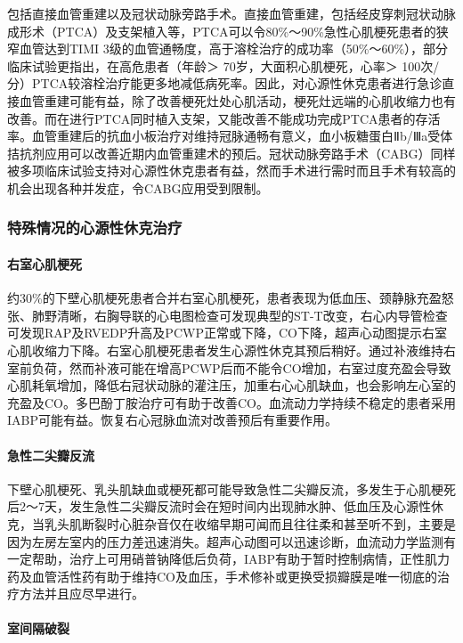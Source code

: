 包括直接血管重建以及冠状动脉旁路手术。直接血管重建，包括经皮穿刺冠状动脉成形术（PTCA）及支架植入等，PTCA可以令80\%～90\%急性心肌梗死患者的狭窄血管达到TIMI
3级的血管通畅度，高于溶栓治疗的成功率（50\%～60\%），部分临床试验更指出，在高危患者（年龄＞
70岁，大面积心肌梗死，心率＞
100次/分）PTCA较溶栓治疗能更多地减低病死率。因此，对心源性休克患者进行急诊直接血管重建可能有益，除了改善梗死灶处心肌活动，梗死灶远端的心肌收缩力也有改善。而在进行PTCA同时植入支架，又能改善不能成功完成PTCA患者的存活率。血管重建后的抗血小板治疗对维持冠脉通畅有意义，血小板糖蛋白Ⅱb/Ⅲa受体拮抗剂应用可以改善近期内血管重建术的预后。冠状动脉旁路手术（CABG）同样被多项临床试验支持对心源性休克患者有益，然而手术进行需时而且手术有较高的机会出现各种并发症，令CABG应用受到限制。

\subsubsection{特殊情况的心源性休克治疗}

\paragraph{右室心肌梗死}

约30\%的下壁心肌梗死患者合并右室心肌梗死，患者表现为低血压、颈静脉充盈怒张、肺野清晰，右胸导联的心电图检查可发现典型的ST-T改变，右心内导管检查可发现RAP及RVEDP升高及PCWP正常或下降，CO下降，超声心动图提示右室心肌收缩力下降。右室心肌梗死患者发生心源性休克其预后稍好。通过补液维持右室前负荷，然而补液可能在增高PCWP后而不能令CO增加，右室过度充盈会导致心肌耗氧增加，降低右冠状动脉的灌注压，加重右心心肌缺血，也会影响左心室的充盈及CO。多巴酚丁胺治疗可有助于改善CO。血流动力学持续不稳定的患者采用IABP可能有益。恢复右心冠脉血流对改善预后有重要作用。

\paragraph{急性二尖瓣反流}

下壁心肌梗死、乳头肌缺血或梗死都可能导致急性二尖瓣反流，多发生于心肌梗死后2～7天，发生急性二尖瓣反流时会在短时间内出现肺水肿、低血压及心源性休克，当乳头肌断裂时心脏杂音仅在收缩早期可闻而且往往柔和甚至听不到，主要是因为左房左室内的压力差迅速消失。超声心动图可以迅速诊断，血流动力学监测有一定帮助，治疗上可用硝普钠降低后负荷，IABP有助于暂时控制病情，正性肌力药及血管活性药有助于维持CO及血压，手术修补或更换受损瓣膜是唯一彻底的治疗方法并且应尽早进行。

\paragraph{室间隔破裂}

